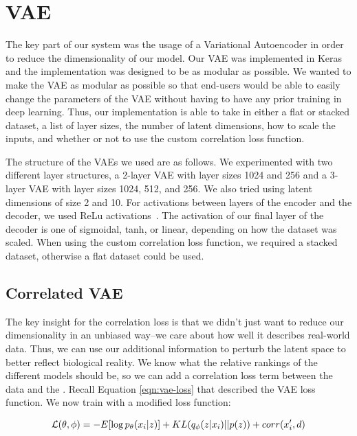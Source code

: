 \section{VAE}
The key part of our system was the usage of a Variational Autoencoder in order to reduce the dimensionality of our model.
Our VAE was implemented in Keras~\cite{chollet2015keras} and the implementation was designed to be as modular as possible.
We wanted to make the VAE as modular as possible so that end-users would be able to easily change the parameters of the VAE without having to have any prior training in deep learning.
Thus, our implementation is able to take in either a flat or stacked dataset, a list of layer sizes, the number of latent dimensions, how to scale the inputs, and whether or not to use the custom correlation loss function.

The structure of the VAEs we used are as follows.
We experimented with two different layer structures, a 2-layer VAE with layer sizes 1024 and 256 and a 3-layer VAE with layer sizes 1024, 512, and 256.
We also tried using latent dimensions of size 2 and 10.
For activations between layers of the encoder and the decoder, we used ReLu activations~\cite{nair2010rectified}.
The activation of our final layer of the decoder is one of sigmoidal, tanh, or linear, depending on how the dataset was scaled.
When using the custom correlation loss function, we required a stacked dataset, otherwise a flat dataset could be used.

\subsection{Correlated VAE}
The key insight for the correlation loss is that we didn't just want to reduce our dimensionality in an unbiased way--we care about how well it describes real-world data.
Thus, we can use our additional information to perturb the latent space to better reflect biological reality.
We know what the relative rankings of the different models should be, so we can add a correlation loss term between the data and the .
Recall Equation \ref{eqn:vae-loss} that described the VAE loss function.
We now train with a modified loss function:

\begin{equation}\label{eqn:corr-loss}
\mathcal{L}(\theta, \phi) = - E[\log p_{\theta}(x_i | z)] + KL(q_{\phi}(z | x_i) || p(z)) + corr(x_i', d)\\
\end{equation}

